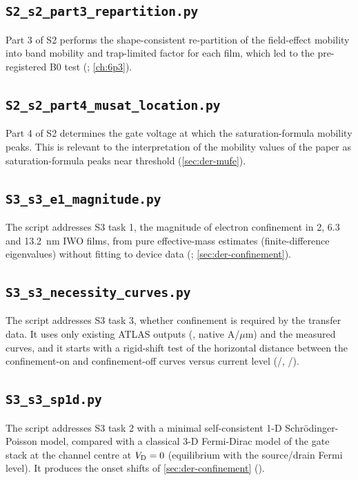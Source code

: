 \subsection{\texttt{S2\_s2\_part3\_repartition.py}}
Part 3 of S2 performs the shape-consistent re-partition of the field-effect mobility into band mobility and
trap-limited factor for each film, which led to the pre-registered B0 test (; \cref{ch:6p3}).


\subsection{\texttt{S2\_s2\_part4\_musat\_location.py}}
Part 4 of S2 determines the gate voltage at which the saturation-formula mobility peaks. This is relevant to the
interpretation of the mobility values of the paper as saturation-formula peaks near threshold (\cref{sec:der-mufe}).


\subsection{\texttt{S3\_s3\_e1\_magnitude.py}}
The script addresses S3 task 1, the magnitude of electron confinement in 2, 6.3 and \SI{13.2}{nm} IWO films, from pure
effective-mass estimates (finite-difference eigenvalues) without fitting to device data (\evTHEORY;
\cref{sec:der-confinement}).


\subsection{\texttt{S3\_s3\_necessity\_curves.py}}
The script addresses S3 task 3, whether confinement is required by the transfer data. It uses only existing ATLAS
outputs (, native A/$\mu$m) and the measured curves, and it starts with a rigid-shift test of the
horizontal distance between the confinement-on and confinement-off curves versus current level (/,
/).


\subsection{\texttt{S3\_s3\_sp1d.py}}
The script addresses S3 task 2 with a minimal self-consistent 1-D Schr\"odinger-Poisson model, compared with a classical
3-D Fermi-Dirac model of the gate stack at the channel centre at $V_{\mathrm{D}} = 0$ (equilibrium with the source/drain Fermi
level). It produces the onset shifts of \cref{sec:der-confinement} (\evSURR).


